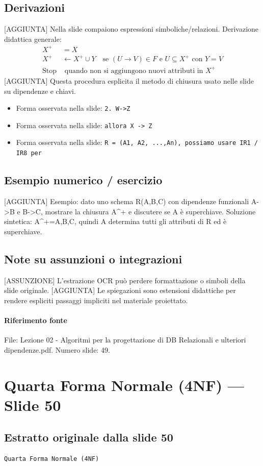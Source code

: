 \documentclass[11pt]{article}
\begin{document}
\subsection*{Derivazioni}
[AGGIUNTA] Nella slide compaiono espressioni simboliche/relazioni. Derivazione didattica generale:
\begin{align*}
X^+ &= X \\
X^+ &\leftarrow X^+ \cup Y \quad \text{se } (U \to V) \in F \text{ e } U \subseteq X^+ \text{ con } Y=V \\
\text{Stop} &\text{ quando non si aggiungono nuovi attributi in } X^+
\end{align*}
[AGGIUNTA] Questa procedura esplicita il metodo di chiusura usato nelle slide su dipendenze e chiavi.
\begin{itemize}[leftmargin=*]
\item Forma osservata nella slide: \texttt{2.   W->Z}
\item Forma osservata nella slide: \texttt{allora X -> Z}
\item Forma osservata nella slide: \texttt{R = (A1, A2, ...,An), possiamo usare IR1 / IR8 per}
\end{itemize}
\subsection*{Esempio numerico / esercizio}
[AGGIUNTA] Esempio: dato uno schema R(A,B,C) con dipendenze funzionali A->B e B->C, mostrare la chiusura A^+ e discutere se A è superchiave. Soluzione sintetica: A^+={A,B,C}, quindi A determina tutti gli attributi di R ed è superchiave.
\subsection*{Note su assunzioni o integrazioni}
[ASSUNZIONE] L'estrazione OCR può perdere formattazione o simboli della slide originale.
[AGGIUNTA] Le spiegazioni sono estensioni didattiche per rendere espliciti passaggi impliciti nel materiale proiettato.
\paragraph{Riferimento fonte} File: Lezione 02 - Algoritmi per la progettazione di DB Relazionali e ulteriori dipendenze.pdf. Numero slide: 49.
\section{Quarta Forma Normale (4NF) --- Slide 50}
\subsection*{Estratto originale dalla slide 50}
\begin{lstlisting}
Quarta Forma Normale (4NF)
\end{lstlisting}
\end{document}
